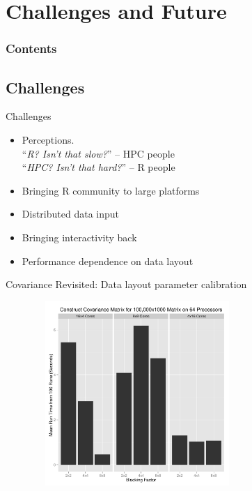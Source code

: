\section{Challenges and Future}

\hidenum
\begin{frame}[noframenumbering]
\frametitle{Contents}
\end{frame}
\shownum

\subsection{Challenges}

\begin{frame}
  \begin{block}{Challenges}
    \begin{itemize}[<+-|alert@+>]
      \item Perceptions.\\
      ``\emph{R?  Isn't that slow?}'' -- HPC people\\
      ``\emph{HPC?  Isn't that hard?}'' -- R people
      \item Bringing R community to large platforms
      \item Distributed data input
      \item Bringing interactivity back
      \item Performance dependence on data layout
    \end{itemize}
  \end{block}
\end{frame}

\begin{frame}
  \begin{block}{Covariance Revisited: Data layout parameter calibration}
    \begin{center}
     \includegraphics[width=10cm, height=7cm]{../common/pics/cov_param}
    \end{center}
  \end{block}
\end{frame}

